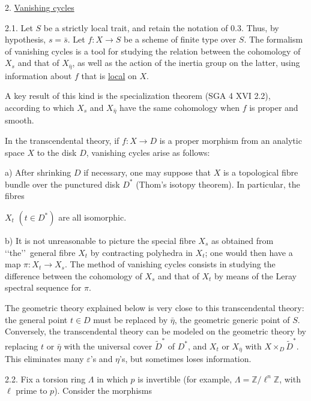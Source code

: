 
2. \underline{Vanishing cycles}

2.1. Let $S$ be a strictly local trait, and retain the notation of 0.3. Thus, by hypothesis, $s=\bar s$. Let $f:X\longrightarrow S$ be a scheme of finite type over $S$. The formalism of vanishing cycles is a tool for studying the relation between the cohomology of $X_s$ and that of $X_{\bar\eta}$, as well as the action of the inertia group on the latter, using information about $f$ that is \underline{local} on $X$.

A key result of this kind is the specialization theorem (SGA 4 XVI 2.2), according to which $X_s$ and $X_{\bar\eta}$ have the same cohomology when $f$ is proper and smooth.

In the transcendental theory, if $f:X\longrightarrow D$ is a proper morphism from an analytic space $X$ to the disk $D$, vanishing cycles arise as follows:

a) After shrinking $D$ if necessary, one may suppose that $X$ is a topological fibre bundle over the punctured disk $D^*$ (Thom's isotopy theorem). In particular, the fibres


$X_t$ $(t\in D^*)$ are all isomorphic.

b) It is not unreasonable to picture the special fibre $X_s$ as obtained from \lq\lq the\rq\rq\ general fibre $X_t$ by contracting polyhedra in $X_t$; one would then have a map $\pi:X_t\longrightarrow X_s$. The method of vanishing cycles consists in studying the difference between the cohomology of $X_s$ and that of $X_t$ by means of the Leray spectral sequence for $\pi$.

The geometric theory explained below is very close to this transcendental theory: the general point $t\in D$ must be replaced by $\bar\eta$, the geometric generic point of $S$. Conversely, the transcendental theory can be modeled on the geometric theory by replacing $t$ or $\bar\eta$ with the universal cover $\widetilde D^*$ of $D^*$, and $X_t$ or $X_{\bar\eta}$ with $X\times_D\widetilde D^*$. This eliminates many $\varepsilon$'s and $\eta$'s, but sometimes loses information.

2.2. Fix a torsion ring $\Lambda$ in which $p$ is invertible (for example, $\Lambda=\mathbb Z/\ell^n\mathbb Z$, with $\ell$ prime to $p$). Consider the morphisms

